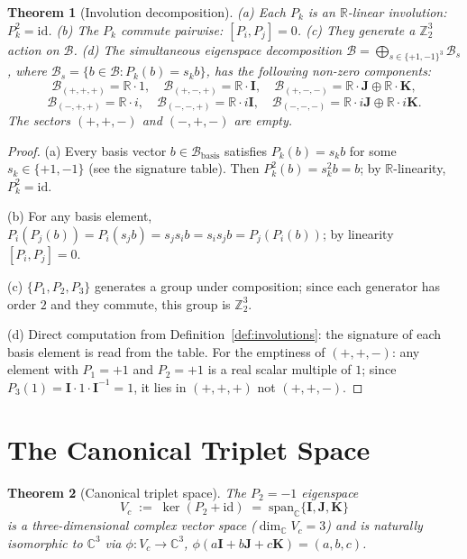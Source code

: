 \documentclass[12pt,a4paper]{article}
\newtheorem{theorem}{Theorem}[section]
\theoremstyle{remark}
\newcommand{\B}{\mathcal{B}}          %
\newcommand{\C}{\mathbb{C}}
\newcommand{\R}{\mathbb{R}}
\begin{document}
\begin{theorem}[Involution decomposition]
  \label{thm:involution_decomp}
  (a) Each $P_k$ is an $\R$-linear involution: $P_k^2 = \mathrm{id}$.
  (b) The $P_k$ commute pairwise: $[P_i,P_j]=0$.
  (c) They generate a $\mathbb{Z}_2^3$ action on $\B$.
  (d) The simultaneous eigenspace decomposition
  $\B = \bigoplus_{s\in\{+1,-1\}^3} \B_s$, where $\B_s = \{b\in\B:P_k(b)=s_k b\}$,
  has the following non-zero components:
  \[
    \B_{(+,+,+)} = \R\cdot 1,\quad
    \B_{(+,-,+)} = \R\cdot\mathbf{I},\quad
    \B_{(+,-,-)} = \R\cdot\mathbf{J}\oplus\R\cdot\mathbf{K},
  \]
  \[
    \B_{(-,+,+)} = \R\cdot i,\quad
    \B_{(-,-,+)} = \R\cdot i\mathbf{I},\quad
    \B_{(-,-,-)} = \R\cdot i\mathbf{J}\oplus\R\cdot i\mathbf{K}.
  \]
  The sectors $(+,+,-)$ and $(-,+,-)$ are empty.
\end{theorem}

\begin{proof}
  (a) Every basis vector $b\in\mathcal{B}_\mathrm{basis}$ satisfies
  $P_k(b) = s_k b$ for some $s_k\in\{+1,-1\}$ (see the signature table).
  Then $P_k^2(b) = s_k^2 b = b$; by $\R$-linearity, $P_k^2=\mathrm{id}$.

  (b) For any basis element, $P_i(P_j(b)) = P_i(s_j b) = s_j s_i b
  = s_i s_j b = P_j(P_i(b))$; by linearity $[P_i,P_j]=0$.

  (c) $\{P_1,P_2,P_3\}$ generates a group under composition; since each
  generator has order $2$ and they commute, this group is $\mathbb{Z}_2^3$.

  (d) Direct computation from Definition~\ref{def:involutions}: the
  signature of each basis element is read from the table.  For the emptiness
  of $(+,+,-)$: any element with $P_1=+1$ and $P_2=+1$ is a real scalar
  multiple of $1$; since $P_3(1)=\mathbf{I}\cdot 1\cdot\mathbf{I}^{-1}=1$,
  it lies in $(+,+,+)$ not $(+,+,-)$.
\end{proof}

\section{The Canonical Triplet Space}
\label{sec:triplet}

\begin{theorem}[Canonical triplet space]
  \label{thm:triplet_space}
  The $P_2=-1$ eigenspace
  \begin{equation}
    \label{eq:Vc}
    V_c \;:=\; \ker(P_2+\mathrm{id})
       \;=\; \mathrm{span}_\C\{\mathbf{I},\mathbf{J},\mathbf{K}\}
  \end{equation}
  is a three-dimensional complex vector space ($\dim_\C V_c = 3$) and is
  naturally isomorphic to $\C^3$ via
  $\phi: V_c\to\C^3$, $\phi(a\mathbf{I}+b\mathbf{J}+c\mathbf{K}) = (a,b,c)$.
\end{theorem}
\end{document}
